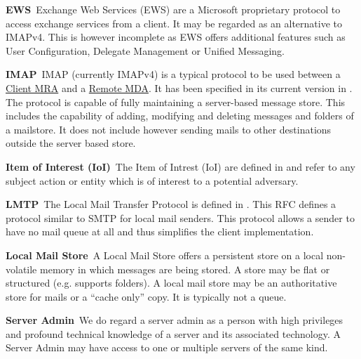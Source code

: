 \documentclass[a4paper,appendixprefix,pdfusetitle,twocolumn,fontsize=8pt,draft,DIV=calc]{scrbook}
\newenvironment{entry}{\par\leavevmode\hangpara{1.5mm}{1}\ignorespaces}{\RaggedRight\par}
\newcommand*{\mainentry}[2]{{\bfseries{#1\label{def:#1}}}~#2\par}
\newcommand*{\defref}[1]{\hyperref[def:#1]{#1}}
\begin{document}
\begin{entry}
	\mainentry{EWS}{Exchange Web Services (EWS) are a Microsoft proprietary protocol to access exchange services from a client. It may be regarded as an alternative to IMAPv4. This is however incomplete as EWS offers additional features such as User Configuration, Delegate Management or Unified Messaging.}
\end{entry}

\begin{entry}
	\mainentry{IMAP}{IMAP (currently IMAPv4) is a typical protocol to be used between a \defref{Client MRA} and a \defref{Remote MDA}. It has been specified in its current version in \cite{RFC3501}. The protocol is capable of fully maintaining a server-based message store. This includes the capability of adding, modifying and deleting messages and folders of a mailstore. It does not include however sending mails to other destinations outside the server based store.}
\end{entry}

\begin{entry}
	\mainentry{Item of Interest (IoI)}{The Item of Intrest (IoI) are defined in \cite{anonTerminology} and refer to any subject action or entity which is of interest to a potential adversary.}
\end{entry}

\begin{entry}
	\mainentry{LMTP}{The Local Mail Transfer Protocol is defined in \cite{RFC2033}. This RFC defines a protocol similar to SMTP for local mail senders. This protocol allows a sender to have no mail queue at all and thus simplifies the client implementation.}
\end{entry}

\begin{entry}
	\mainentry{Local Mail Store}{A Local Mail Store offers a persistent store on a local non-volatile memory in which messages are being stored. A store may be flat or structured (e.g. supports folders). A local mail store may be an authoritative store for mails or a ``cache only'' copy. It is typically not a queue.}
\end{entry}

\begin{entry}
	\mainentry{Server Admin}{We do regard a server admin as a person with high privileges and profound technical knowledge of a server and its associated technology. A Server Admin may have access to one or multiple servers of the same kind.}
\end{entry}
\end{document}
